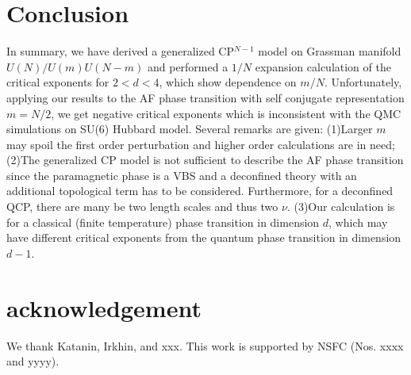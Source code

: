 \documentclass[aps,twocolumn,superscriptaddress]{revtex4-1}
\begin{document}
\section{Conclusion}
In summary, we have derived a generalized CP$^{N-1}$ model on Grassman manifold $U(N)/U(m)U(N-m)$ and performed a $1/N$
expansion calculation of the critical exponents for $2<d<4$, which show dependence on $m/N$. Unfortunately, applying our
results to the AF phase transition with self conjugate representation $m=N/2$, we get negative critical exponents which
is inconsistent with the QMC simulations on SU(6) Hubbard model. Several remarks are given: (1)Larger $m$ may spoil the
first order perturbation and higher order calculations are in need; (2)The generalized CP model is not sufficient to
describe the AF phase transition since the paramagnetic phase is a VBS and a deconfined theory with an additional
topological term has to be considered. \cite{senthil2004} Furthermore, for a deconfined QCP, there are many be two
length scales and thus two $\nu$. \cite{Shao2016} (3)Our calculation is for a classical (finite temperature) phase
transition in dimension $d$, which may have different critical exponents from the quantum phase transition in dimension
$d-1$. \cite{sondhi1997}


\section{acknowledgement}
We thank Katanin, Irkhin, and xxx. This work is supported by NSFC (Nos. xxxx and yyyy).



\end{document}
